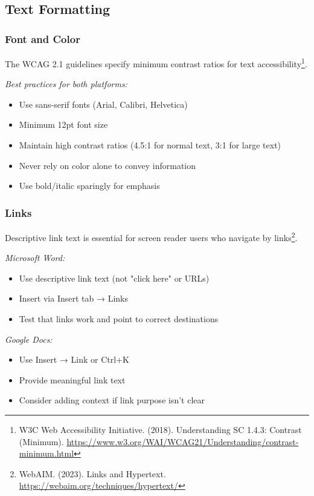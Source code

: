 \subsection{Text Formatting}

\subsubsection{Font and Color}
The WCAG 2.1 guidelines specify minimum contrast ratios for text accessibility\footnote{W3C Web Accessibility Initiative. (2018). Understanding SC 1.4.3: Contrast (Minimum). \url{https://www.w3.org/WAI/WCAG21/Understanding/contrast-minimum.html}}.

\emph{Best practices for both platforms:}
\begin{itemize}
\item Use sans-serif fonts (Arial, Calibri, Helvetica)
\item Minimum 12pt font size
\item Maintain high contrast ratios (4.5:1 for normal text, 3:1 for large text)
\item Never rely on color alone to convey information
\item Use bold/italic sparingly for emphasis
\end{itemize}

\subsubsection{Links}
Descriptive link text is essential for screen reader users who navigate by links\footnote{WebAIM. (2023). Links and Hypertext. \url{https://webaim.org/techniques/hypertext/}}.

\emph{Microsoft Word:}
\begin{itemize}
\item Use descriptive link text (not "click here" or URLs)
\item Insert via Insert tab → Links
\item Test that links work and point to correct destinations
\end{itemize}

\emph{Google Docs:}
\begin{itemize}
\item Use Insert → Link or Ctrl+K
\item Provide meaningful link text
\item Consider adding context if link purpose isn't clear
\end{itemize}

